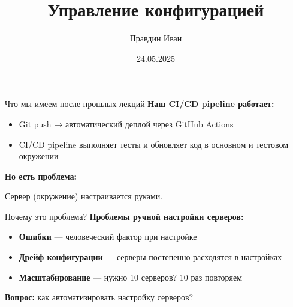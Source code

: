 \documentclass[aspectratio=169]{beamer}
\title{Управление конфигурацией}
\author{Правдин Иван}
\date{24.05.2025}
\begin{document}
    \maketitle

    \begin{frame}{Что мы имеем после прошлых лекций}
        \textbf{Наш CI/CD pipeline работает:}
        
        \begin{itemize}
            \item Git push → автоматический деплой через GitHub Actions
            \item CI/CD pipeline выполняет тесты и обновляет код в основном и тестовом окружении
        \end{itemize}

        \textbf{Но есть проблема:}

        Сервер (окружение) настраивается руками.
    \end{frame}

    \begin{frame}{Почему это проблема?}
        \textbf{Проблемы ручной настройки серверов:}
        
        \begin{itemize}
            \item \textbf{Ошибки} — человеческий фактор при настройке
            \item \textbf{Дрейф конфигурации} — серверы постепенно расходятся в настройках
            \item \textbf{Масштабирование} — нужно 10 серверов? 10 раз повторяем
        \end{itemize}
        
        \vspace{0.5cm}
        
        \textbf{Вопрос:} как автоматизировать настройку серверов?
    \end{frame}
\end{document}
